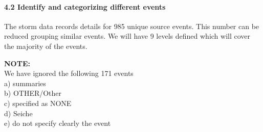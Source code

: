 \documentclass[]{article}
\let\oldparagraph\paragraph
\renewcommand{\paragraph}[1]{\oldparagraph{#1}\mbox{}}
\begin{document}
\paragraph{4.2 Identify and categorizing different
events}\label{identify-and-categorizing-different-events}

The storm data records details for 985 unique source events. This number
can be reduced grouping similar events. We will have 9 levels defined
which will cover the majority of the events.

\textbf{NOTE:}\\
We have ignored the following 171 events\\
a) summaries\\
b) OTHER/Other\\
c) specified as NONE\\
d) Seiche\\
e) do not specify clearly the event
\end{document}

